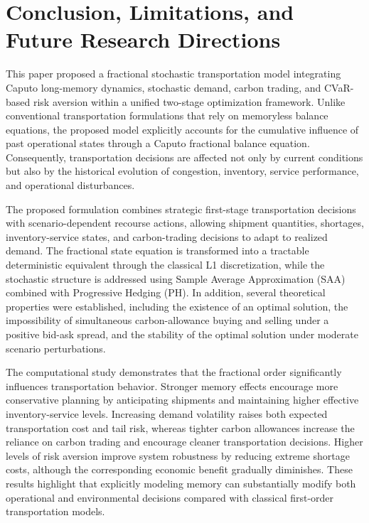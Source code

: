 \section{Conclusion, Limitations, and Future Research Directions}

This paper proposed a fractional stochastic transportation model integrating Caputo long-memory dynamics, stochastic demand, carbon trading, and CVaR-based risk aversion within a unified two-stage optimization framework. Unlike conventional transportation formulations that rely on memoryless balance equations, the proposed model explicitly accounts for the cumulative influence of past operational states through a Caputo fractional balance equation. Consequently, transportation decisions are affected not only by current conditions but also by the historical evolution of congestion, inventory, service performance, and operational disturbances.

The proposed formulation combines strategic first-stage transportation decisions with scenario-dependent recourse actions, allowing shipment quantities, shortages, inventory-service states, and carbon-trading decisions to adapt to realized demand. The fractional state equation is transformed into a tractable deterministic equivalent through the classical L1 discretization, while the stochastic structure is addressed using Sample Average Approximation (SAA) combined with Progressive Hedging (PH). In addition, several theoretical properties were established, including the existence of an optimal solution, the impossibility of simultaneous carbon-allowance buying and selling under a positive bid-ask spread, and the stability of the optimal solution under moderate scenario perturbations.

The computational study demonstrates that the fractional order significantly influences transportation behavior. Stronger memory effects encourage more conservative planning by anticipating shipments and maintaining higher effective inventory-service levels. Increasing demand volatility raises both expected transportation cost and tail risk, whereas tighter carbon allowances increase the reliance on carbon trading and encourage cleaner transportation decisions. Higher levels of risk aversion improve system robustness by reducing extreme shortage costs, although the corresponding economic benefit gradually diminishes. These results highlight that explicitly modeling memory can substantially modify both operational and environmental decisions compared with classical first-order transportation models.

